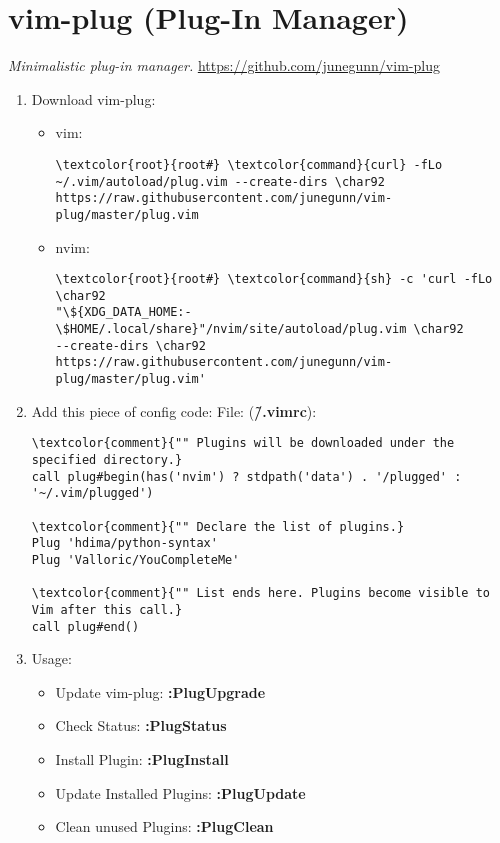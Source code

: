 \documentclass[10pt, a4paper, onecolumn, openany]{book} %
\begin{document}
\section{vim-plug (Plug-In Manager)}
\textit{Minimalistic plug-in manager.}
\newline\underline{\url{https://github.com/junegunn/vim-plug}}
\begin{enumerate}
    \item Download vim-plug:
    \begin{itemize}
        \item vim:
\begin{Verbatim}[commandchars=\\\{\}]
\textcolor{root}{root#} \textcolor{command}{curl} -fLo ~/.vim/autoload/plug.vim --create-dirs \char92
https://raw.githubusercontent.com/junegunn/vim-plug/master/plug.vim
\end{Verbatim}  
        \item nvim:
\begin{Verbatim}[commandchars=\\\{\}]
\textcolor{root}{root#} \textcolor{command}{sh} -c 'curl -fLo \char92
"\${XDG_DATA_HOME:-\$HOME/.local/share}"/nvim/site/autoload/plug.vim \char92
--create-dirs \char92
https://raw.githubusercontent.com/junegunn/vim-plug/master/plug.vim'
\end{Verbatim}  
        \end{itemize}
    \item Add this piece of config code:
\newline File: (\textbf{\textcolor{file}{\~/.vimrc}}):
\begin{Verbatim}[commandchars=\\\{\}]
\textcolor{comment}{"" Plugins will be downloaded under the specified directory.}
call plug#begin(has('nvim') ? stdpath('data') . '/plugged' : '~/.vim/plugged')

\textcolor{comment}{"" Declare the list of plugins.}
Plug 'hdima/python-syntax'
Plug 'Valloric/YouCompleteMe'

\textcolor{comment}{"" List ends here. Plugins become visible to Vim after this call.}
call plug#end()
\end{Verbatim}    
    \item Usage:
    \begin{itemize} 
        \item Update vim-plug: \textbf{:PlugUpgrade}
        \item Check Status: \textbf{:PlugStatus}
        \item Install Plugin: \textbf{:PlugInstall}
        \item Update Installed Plugins:
        \textbf{:PlugUpdate}
        \item Clean unused Plugins: \textbf{:PlugClean}
    \end{itemize}
\end{enumerate}
\end{document}
